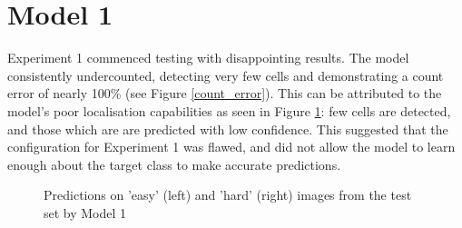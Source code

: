 \section{Model 1}
Experiment 1 commenced testing with disappointing results. The model consistently undercounted, detecting very few cells and demonstrating a count error of nearly 100\% (see Figure \ref{count_error}). This can be attributed to the model's poor localisation capabilities as seen in Figure \ref{model1}: few cells are detected, and those which are are predicted with low confidence. This suggested that the configuration for Experiment 1 was flawed, and did not allow the model to learn enough about the target class to make accurate predictions.\\

\begin{figure}
\caption{Predictions on 'easy' (left) and 'hard' (right) images from the test set by Model 1}
\label{model1}
\end{figure}

